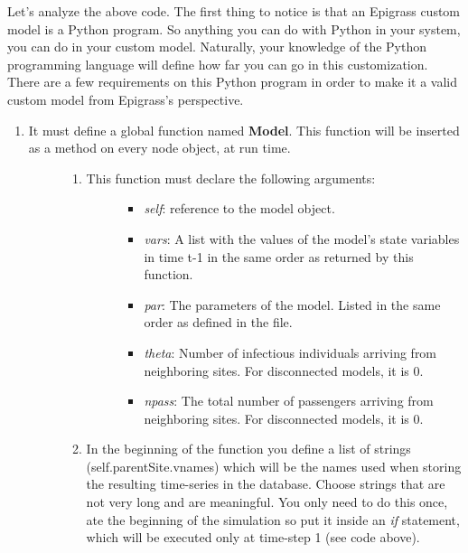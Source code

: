 \documentclass[a4paper,10pt,english]{sphinxmanual}
\begin{document}
Let's analyze the above code. The first thing to notice is that an Epigrass custom model is a Python program. So anything you can do with Python in your system, you can do in your custom model. Naturally, your knowledge of the Python programming language will define how far you can go in this customization. There are a few requirements on this Python program in order to make it a valid custom model from Epigrass's perspective.
\begin{enumerate}
\item {} \begin{description}
\item[{It must define a global function named \textbf{Model}. This function will be inserted as a method on every node object, at run time.}] \leavevmode\begin{enumerate}
\item {} \begin{description}
\item[{This function must declare the following arguments:}] \leavevmode\begin{itemize}
\item {} 
\emph{self}: reference to the model object.

\item {} 
\emph{vars}: A list with the values of the model's state variables in time t-1 in the same order as returned by this function.

\item {} 
\emph{par}: The parameters of the model. Listed in the same order as defined in the  file.

\item {} 
\emph{theta}: Number of infectious individuals arriving from neighboring sites. For disconnected models, it is 0.

\item {} 
\emph{npass}: The total number of passengers arriving from neighboring sites. For disconnected models, it is 0.

\end{itemize}

\end{description}

\item {} 
In the beginning of the function you define a list of strings (self.parentSite.vnames) which will be the names used when storing the resulting time-series in the database. Choose strings that are not very long and are meaningful. You only need to do this once, ate the beginning of the simulation so put it inside an \emph{if} statement, which will be executed only at time-step 1 (see code above).


\end{enumerate}
\end{description}
\end{enumerate}
\end{document}
